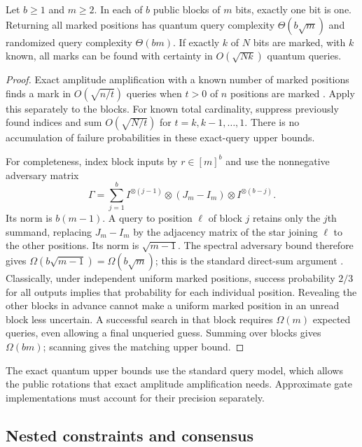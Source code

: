 \begin{lemma}
\label{active:search}
Let $b\geq1$ and $m\geq2$. In each of $b$ public blocks of $m$ bits,
exactly one bit is one. Returning all marked positions has quantum query
complexity $\Theta(b\sqrt m)$ and randomized query complexity
$\Theta(bm)$. If exactly $k$ of $N$ bits are marked, with $k$ known,
all marks can be found with certainty in $O(\sqrt{Nk})$ quantum queries.
\end{lemma}
\begin{proof}
Exact amplitude amplification with a known number of marked positions
finds a mark in $O(\sqrt{n/t})$ queries when $t>0$ of $n$ positions are
marked \cite[Theorem~4]{BHMT2002}. Apply this separately to the blocks.
For known total cardinality, suppress previously found indices and sum
$O(\sqrt{N/t})$ for $t=k,k-1,\ldots,1$. There is no accumulation of
failure probabilities in these exact-query upper bounds.

For completeness, index block inputs by $r\in[m]^b$ and use the
nonnegative adversary matrix
\[
 \Gamma=\sum_{j=1}^b
 I^{\otimes(j-1)}\otimes(J_m-I_m)\otimes I^{\otimes(b-j)}.
\]
Its norm is $b(m-1)$. A query to position $\ell$ of block $j$ retains
only the $j$th summand, replacing $J_m-I_m$ by the adjacency matrix
of the star joining $\ell$ to the other positions. Its norm is
$\sqrt{m-1}$. The spectral adversary bound therefore gives
$\Omega(b\sqrt{m-1})=\Omega(b\sqrt m)$; this is the standard
direct-sum argument \cite[Theorems~3--4]{ACGT2010}.
Classically, under independent uniform marked positions, success
probability $2/3$ for all outputs implies that probability for each
individual position. Revealing the other blocks in advance cannot
make a uniform marked position in an unread block less uncertain.
A successful search in that block requires $\Omega(m)$ expected
queries, even allowing a final unqueried guess. Summing over blocks
gives $\Omega(bm)$; scanning gives the matching upper bound.
\end{proof}

The exact quantum upper bounds use the standard query model, which
allows the public rotations that exact amplitude amplification needs.
Approximate gate implementations must account for their precision
separately.

\subsection{Nested constraints and consensus}


